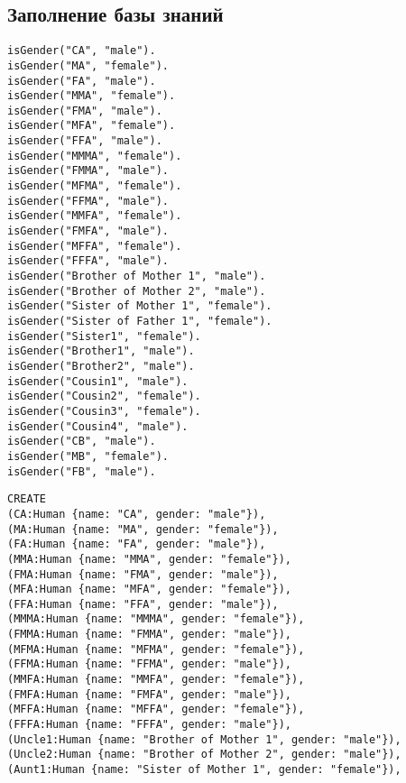 \subsection*{Заполнение базы знаний}
\noindent\begin{minipage}[T]{.45\textwidth}
	\begin{lstlisting}[caption=Prolog]
isGender("CA", "male").
isGender("MA", "female").
isGender("FA", "male").
isGender("MMA", "female").
isGender("FMA", "male").
isGender("MFA", "female").
isGender("FFA", "male").
isGender("MMMA", "female").
isGender("FMMA", "male").
isGender("MFMA", "female").
isGender("FFMA", "male").
isGender("MMFA", "female").
isGender("FMFA", "male").
isGender("MFFA", "female").
isGender("FFFA", "male").
isGender("Brother of Mother 1", "male").
isGender("Brother of Mother 2", "male").
isGender("Sister of Mother 1", "female").
isGender("Sister of Father 1", "female").
isGender("Sister1", "female").
isGender("Brother1", "male").
isGender("Brother2", "male").
isGender("Cousin1", "male").
isGender("Cousin2", "female").
isGender("Cousin3", "female").
isGender("Cousin4", "male").
isGender("CB", "male").
isGender("MB", "female").
isGender("FB", "male").			
	\end{lstlisting}
\end{minipage}\hfill
\begin{minipage}[T]{.5\textwidth}
	\begin{lstlisting}[caption=Neo4j]
CREATE   
(CA:Human {name: "CA", gender: "male"}),
(MA:Human {name: "MA", gender: "female"}),
(FA:Human {name: "FA", gender: "male"}),
(MMA:Human {name: "MMA", gender: "female"}),
(FMA:Human {name: "FMA", gender: "male"}),
(MFA:Human {name: "MFA", gender: "female"}),
(FFA:Human {name: "FFA", gender: "male"}),
(MMMA:Human {name: "MMMA", gender: "female"}),
(FMMA:Human {name: "FMMA", gender: "male"}),
(MFMA:Human {name: "MFMA", gender: "female"}),
(FFMA:Human {name: "FFMA", gender: "male"}),
(MMFA:Human {name: "MMFA", gender: "female"}),
(FMFA:Human {name: "FMFA", gender: "male"}),
(MFFA:Human {name: "MFFA", gender: "female"}),
(FFFA:Human {name: "FFFA", gender: "male"}),
(Uncle1:Human {name: "Brother of Mother 1", gender: "male"}),
(Uncle2:Human {name: "Brother of Mother 2", gender: "male"}),
(Aunt1:Human {name: "Sister of Mother 1", gender: "female"}),
	\end{lstlisting}
\end{minipage}

